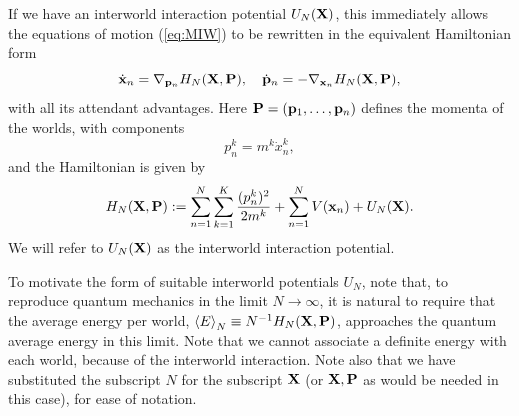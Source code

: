 \documentclass[twocolumn,aps,pra,amsmath,amssymb,superscriptaddress]{revtex4}
\newcommand{\beq}{\begin{equation}}
\newcommand{\eeq}{\end{equation}}
\newcommand{\an}[1]{\left\langle{#1}\right\rangle}
\renewcommand{\(}{\left(}
\renewcommand{\)}{\right)}
\newcommand{\red}{\color{red}}
\newcommand{\blk}{\color{black}}
\newcommand{\blu}{\color{blue}}
\renewcommand\blu{\blk}
\renewcommand\red{\blk}
\begin{document}
\red If we have an  interworld interaction potential $ U_N({\bf X})$, \blk this immediately allows the equations of motion (\ref{eq:MIW}) to be rewritten in the equivalent Hamiltonian form
\begin{equation} \label{hameq}
\dot{{\bf x}}_n = \nabla_{{\bf p}_n} H_N({\bf X,P}),~~~\dot{{\bf p}}_n = - \nabla_{{\bf x}_n} H_N({\bf X,P}),
\end{equation}
with all its attendant advantages. Here ${\bf P}=({\bf p}_1,\dots,{\bf p}_n)$ defines the momenta of the worlds, 
 with components 
 \beq
 p^k_n=m^k\dot x^k_n,
 \eeq \blk and the Hamiltonian is given by
\begin{equation} \label{ham}
H_N({\bf X,P}) := \sum_{n=1}^N\sum_{k=1}^K \frac{(p^k_n)^2}{2m^k} + \sum_{n=1}^N V({\bf x}_n) + U_N({\bf X}).
\end{equation}
We will refer to $ U_N({\bf X})$ as the interworld interaction potential.

To motivate the form of suitable interworld potentials $U_N$, note that, to reproduce quantum mechanics in the limit $N\to\infty$, \blu it is natural to require that \blk the average energy per world, $\an{E}_{N} \equiv N^{-1}H_N({\bf X,P})$,  \blk
approaches the quantum average energy in this limit.  
 Note that we cannot associate a definite energy with each world, because of the interworld interaction. 
 Note also that we have substituted the subscript $N$ for the subscript ${\bf X}$ 
 (or ${\bf X},{\bf P}$ as would be needed in this case), for ease of notation.\blk  
 
\end{document}
